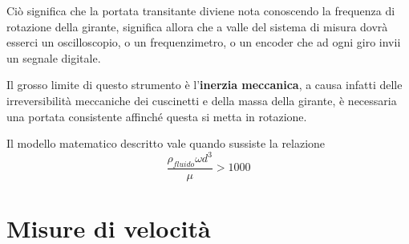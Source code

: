 \documentclass[a4paper, 15pt]{article}
\begin{document}
\begin{adjustwidth}{2in}{}
	Ciò significa che la portata transitante diviene nota conoscendo la frequenza di rotazione della girante, significa allora che a valle del sistema di misura dovrà esserci un oscilloscopio, o un frequenzimetro, o un encoder che ad ogni giro invii un segnale digitale. \newline 
	
	Il grosso limite di questo strumento è l'\textbf{inerzia meccanica}, a causa infatti delle irreversibilità meccaniche dei cuscinetti e della massa della girante, è necessaria una portata consistente affinché questa si metta in rotazione. 
	
	Il modello matematico descritto vale quando sussiste la relazione
	\[\dfrac{\rho_{fluido}\omega d^3}{\mu}>1000\]
\end{adjustwidth}
\newpage
\section{Misure di velocità}
\end{document}
